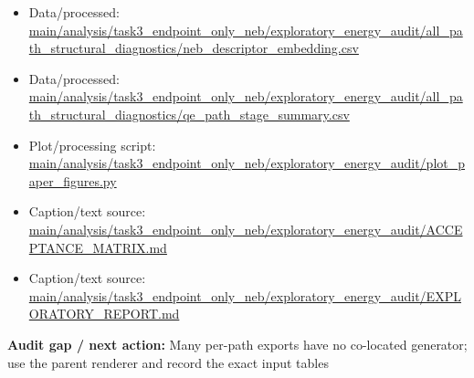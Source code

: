 \documentclass[10pt]{article}
\newcommand{\statusline}[1]{\colorbox{gray!12}{\parbox{0.96\linewidth}{#1}}}
\begin{document}
\begin{itemize}[leftmargin=1.4em,noitemsep]
\item Data/processed: \begingroup\scriptsize\url{main/analysis/task3_endpoint_only_neb/exploratory_energy_audit/all_path_structural_diagnostics/neb_descriptor_embedding.csv}\endgroup
\item Data/processed: \begingroup\scriptsize\url{main/analysis/task3_endpoint_only_neb/exploratory_energy_audit/all_path_structural_diagnostics/qe_path_stage_summary.csv}\endgroup
\item Plot/processing script: \begingroup\scriptsize\url{main/analysis/task3_endpoint_only_neb/exploratory_energy_audit/plot_paper_figures.py}\endgroup
\item Caption/text source: \begingroup\scriptsize\url{main/analysis/task3_endpoint_only_neb/exploratory_energy_audit/ACCEPTANCE_MATRIX.md}\endgroup
\item Caption/text source: \begingroup\scriptsize\url{main/analysis/task3_endpoint_only_neb/exploratory_energy_audit/EXPLORATORY_REPORT.md}\endgroup
\end{itemize}
\statusline{\textbf{Audit gap / next action:} Many per-path exports have no co-located generator; use the parent renderer and record the exact input tables}
\vfill
\clearpage
\end{document}

